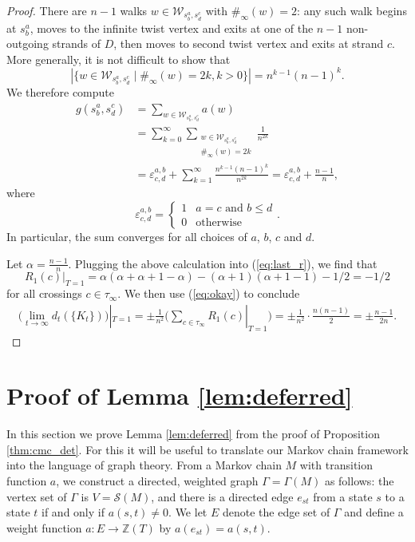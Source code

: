 \documentclass[11pt,hyp,]{nyjm}
\newcommand{\Z}{\mathbb{Z}}
\numberwithin{thm}{section}
\theoremstyle{definition}
\theoremstyle{remark}
\begin{document}
\begin{proof}
		There are $n - 1$ walks $w \in \mathcal{W}_{s^a_b,s^c_d}$ with $\#_\infty(w) = 2$: any such walk begins at $s^a_b$, moves to the infinite twist vertex and exits at one of the $n - 1$ non-outgoing strands of $D$, then moves to second twist vertex and exits at strand $c$. More generally, it is not difficult to show that
		$$
		|\{w \in \mathcal{W}_{s^a_b,s^c_d} \mid \#_\infty(w) = 2k, k > 0\}| = n^{k - 1}(n - 1)^k.
		$$
		We therefore compute
		\begin{align*}
			g(s^a_b, s^c_d) &= \sum_{w \in \mathcal{W}_{s^a_b,s^c_d}} a(w) \\
										 &= \sum_{k = 0}^\infty \sum_{\substack{w \in \mathcal{W}_{s^a_b,s^c_d} \\ \#_\infty(w) = 2k}} \frac{1}{n^{2k}} \\
										 &= \varepsilon^{a,b}_{c,d} + \sum_{k = 1}^\infty \frac{n^{k - 1}(n - 1)^k}{n^{2k}} = \varepsilon^{a,b}_{c,d} + \frac{n - 1}{n},
		\end{align*}
		where
		$$
		\varepsilon^{a,b}_{c,d}  = \begin{cases} 1 & a = c \text{ and } b \leq d \\ 0 & \text{otherwise} \end{cases}.
		$$
		In particular, the sum converges for all choices of $a$, $b$, $c$ and $d$.
		
		Let $\alpha =  \frac{n - 1}{n}$. Plugging the above calculation into (\ref{eq:last_r}), we find that
		$$
		R_1(c)|_{T = 1} = \alpha(\alpha + \alpha + 1 - \alpha) - (\alpha + 1)(\alpha + 1 - 1) - 1/2= -1/2
		$$
		for all crossings $c \in \tau_\infty$. We then use (\ref{eq:okay}) to conclude
		\begin{align*}
		\Big( \lim_{t \to \infty} d_t(\{K_t\}) \Big)|_{T = 1} = \pm \frac{1}{n^2} \Big( \sum_{c \in \tau_\infty} R_1(c)|_{T = 1} \Big) = \pm \frac{1}{n^2} \cdot \frac{n(n - 1)}{2} = \pm \frac{n - 1}{2n}.
		\end{align*}
	\end{proof}
	
\section{Proof of Lemma \protect\ref{lem:deferred}}
	\label{sec:lemma}
	
	In this section we prove Lemma \ref{lem:deferred} from the proof of Proposition \ref{thm:cmc_det}. For this it will be useful to translate our Markov chain framework into the language of graph theory. From a Markov chain $M$ with transition function $a$, we construct a directed, weighted graph $\Gamma = \Gamma(M)$ as follows: the vertex set of $\Gamma$ is $V = \mathcal{S}(M)$, and there is a directed edge $e_{st}$ from a state $s$ to a state $t$ if and only if $a(s,t) \neq 0$. We let $E$ denote the edge set of $\Gamma$ and define a weight function $a : E \to \Z(T)$ by $a(e_{st}) = a(s,t)$.
	
\end{document}
